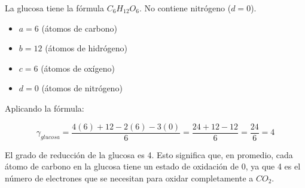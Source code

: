 La glucosa tiene la fórmula $C_6H_{12}O_6$. No contiene nitrógeno ($d=0$).

\begin{itemize}
    \item $a = 6$ (átomos de carbono)
    \item $b = 12$ (átomos de hidrógeno)
    \item $c = 6$ (átomos de oxígeno)
    \item $d = 0$ (átomos de nitrógeno)
\end{itemize}

Aplicando la fórmula:

\[
\gamma_{glucosa} = \frac{4(6) + 12 - 2(6) - 3(0)}{6} = \frac{24 + 12 - 12}{6} = \frac{24}{6} = 4
\]

El grado de reducción de la glucosa es 4. Esto significa que, en promedio, cada átomo de carbono en la glucosa tiene un estado de oxidación de 0, ya que 4 es el número de electrones que se necesitan para oxidar completamente a $CO_2$.


